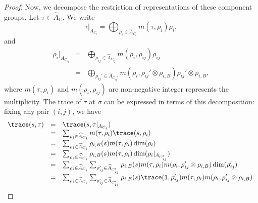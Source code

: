 \documentclass[11pt,letterpaper]{amsart}
\numberwithin{equation}{section}
\begin{document}
\begin{proof}
Now, we decompose the restriction of representations of these component groups. Let $\tau \in \widehat{A}_{C}$. We write
\[ 
\tau|_{A_{C_i}}= \bigoplus_{\rho_i \in \widehat{A}_{C_{i}}} m(\tau, \rho_i) \rho_i, 
\]
and
\[
\begin{array}{rcl}
\rho_i|_{A_{C_{ij}}}
&=& \bigoplus_{ \rho_{ij}\in \widehat{A}_{C_{ij}}} m(\rho_i, \rho_{ij}) \rho_{ij} \\
&=& \bigoplus_{\rho_{ij}' \in \widehat{A}_{C_{ij}'}}  m(\rho_i, \rho_{ij}' \otimes \rho_{i,B}) \rho_{ij}' \otimes \rho_{i,B}, 
\end{array}
\]
where $m(\tau, \rho_i)$ and $m(\rho_i, \rho_{ij}) $ are non-negative integer represents the multiplicity. The trace of $\tau$ at $\sigma$ can be expressed in terms of this decomposition: fixing any pair $(i,j)$, we have
\begin{equation}\label{equation: Lift of ABV, 4}
\begin{array}{rcl}
 \trace(s, \tau)
 &=& \trace(s, \tau|_{A_{C_{i}}}) \\
 &=& \sum_{\rho_i\in \widehat{A}_{C_{i}}} m(\tau, \rho_{i}) \trace(s, \rho_i) \\
&=&\sum_{\rho_i\in \widehat{A}_{C_{i}}} \rho_{i,B}(s)   m(\tau, \rho_{i}) \dim(\rho_i)\ \\
&=&\sum_{\rho_i\in \widehat{A}_{C_{i}}}  \rho_{i,B}(s)  m(\tau, \rho_{i})   \dim(\rho_i |_{A_{C_{ij}'}})\\
&= &\sum_{\rho_i\in \widehat{A}_{C_{i}}}  \sum_{\rho_{ij}'\in \widehat{A}_{C_{ij}'}}
\rho_{i,B}(s)  m(\tau, \rho_{i}) m(\rho_i, \rho_{ij}' \otimes \rho_{i,B})  \dim( \rho_{ij}')\\
&=& \sum_{\rho_i\in \widehat{A}_{C_{i}}}  \sum_{\rho_{ij}'\in \widehat{A}_{C_{ij}'}} \rho_{i,B}(s) \trace(1, \rho_{ij}')  m(\tau, \rho_{i}) m(\rho_i, \rho_{ij}' \otimes \rho_{i,B}). 
\end{array}
\end{equation}





\end{proof}
\end{document}
